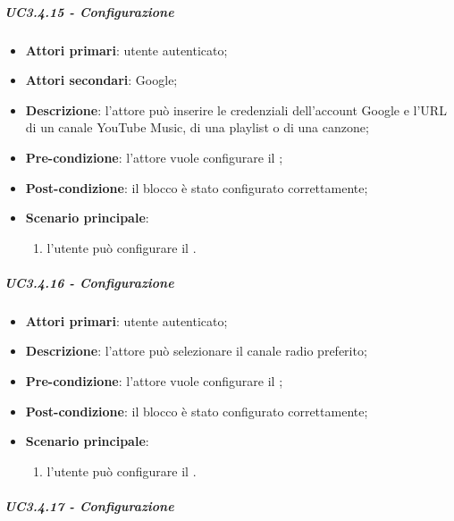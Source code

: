 \subparagraph{UC3.4.15 - Configurazione \BYouTubeMusic{}}

\begin{itemize}
\item \textbf{Attori primari}: utente autenticato;

\item \textbf{Attori secondari}: Google;

\item \textbf{Descrizione}: l'attore può inserire le credenziali dell'account Google e l'URL di un canale YouTube Music, di una playlist o di una canzone;

\item \textbf{Pre-condizione}: l'attore vuole configurare il \BYouTubeMusic{};

\item \textbf{Post-condizione}:  il blocco è stato configurato correttamente;

\item \textbf{Scenario principale}:
\begin{enumerate}
\item  l'utente può configurare il \BYouTubeMusic{}.

\end{enumerate}
\end{itemize}

\subparagraph{UC3.4.16 - Configurazione \BRadio{}}

\begin{itemize}
\item \textbf{Attori primari}: utente autenticato;

\item \textbf{Descrizione}: l'attore può selezionare il canale radio preferito;

\item \textbf{Pre-condizione}: l'attore vuole configurare il \BRadio{};

\item \textbf{Post-condizione}:  il blocco è stato configurato correttamente;

\item \textbf{Scenario principale}:
\begin{enumerate}
\item  l'utente può configurare il \BRadio{}.

\end{enumerate}
\end{itemize}

\subparagraph{UC3.4.17 - Configurazione \BTV{}}

